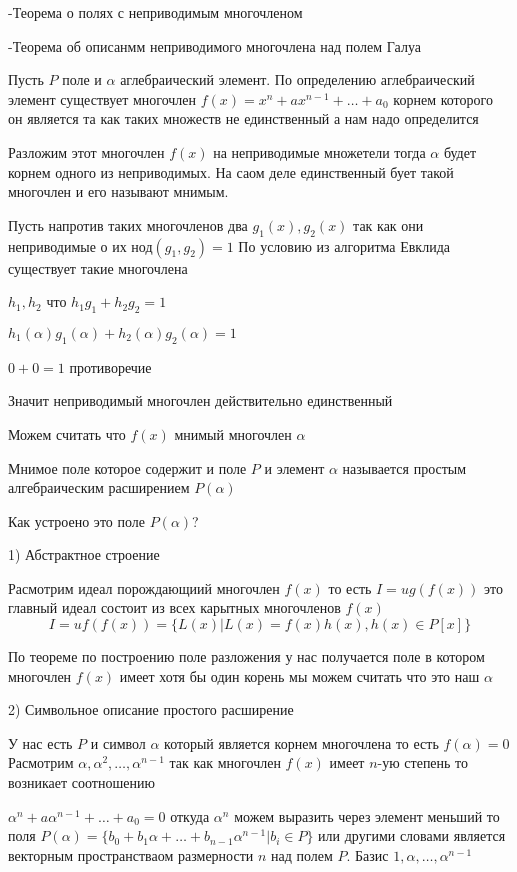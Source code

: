 -Теорема о полях с неприводимым многочленом

-Теорема об описанмм неприводимого многочлена над полем Галуа

Пусть $P$ поле и $\alpha$ аглебраический элемент. По определению аглебраический
элемент существует многочлен $f(x) = x^n + ax^{n-1} + \ldots + a_0$ корнем
которого он является та как таких множеств не единственный а нам надо
определится

Разложим этот многочлен $f(x)$ на неприводимые множетели тогда $\alpha$ будет
корнем одного из неприводимых. На саом деле единственный бует такой многочлен
и его называют мнимым.

Пусть напротив таких многочленов два $g_1(x), g_2(x)$ так как они неприводимые
о их нод$(g_1, g_2) = 1$ По условию из алгоритма Евклида существует такие
многочлена

$h_1, h_2$ что $h_1g_1 + h_2g_2 = 1$

$h_1(\alpha)g_1(\alpha) + h_2(\alpha)g_2(\alpha) = 1$

$0 + 0 = 1$ противоречие

Значит неприводимый многочлен действительно единственный

Можем считать что $f(x)$ мнимый многочлен $\alpha$

Мнимое поле которое содержит и поле $P$ и элемент $\alpha$ называется простым
алгебраическим расширением $P(\alpha)$

Как устроено это поле $P(\alpha)$?

1) Абстрактное строение

Расмотрим идеал порождающиий многочлен $f(x)$ то есть $I = ug(f(x))$ это
главный идеал состоит из всех карытных многочленов $f(x)$
$$
I = uf(f(x)) = \{L(x)| L(x) = f(x)h(x), h(x) \in P[x]\}
$$

По теореме по построению поле разложения у нас получается поле в котором
многочлен $f(x)$ имеет хотя бы один корень мы можем считать что это наш
$\alpha$

2) Символьное описание простого расширение

У нас есть $P$ и символ $\alpha$ который является корнем многочлена то есть
$f(\alpha) = 0$ Расмотрим $\alpha, \alpha^2, \ldots, \alpha^{n-1}$ так как
многочлен $f(x)$ имеет $n$-ую степень то возникает соотношению

$\alpha^n + a\alpha^{n-1}+ \ldots + a_0 = 0$ откуда $\alpha^n$ можем выразить
через элемент меньший то поля $P(\alpha) = \{b_0 + b_1\alpha + \ldots +
b_{n-1}\alpha^{n-1} |b_i \in P\}$ или другими словами является векторным
пространстваом размерности $n$ над полем $P$. Базис $1,\alpha, \ldots,
\alpha^{n-1}$

